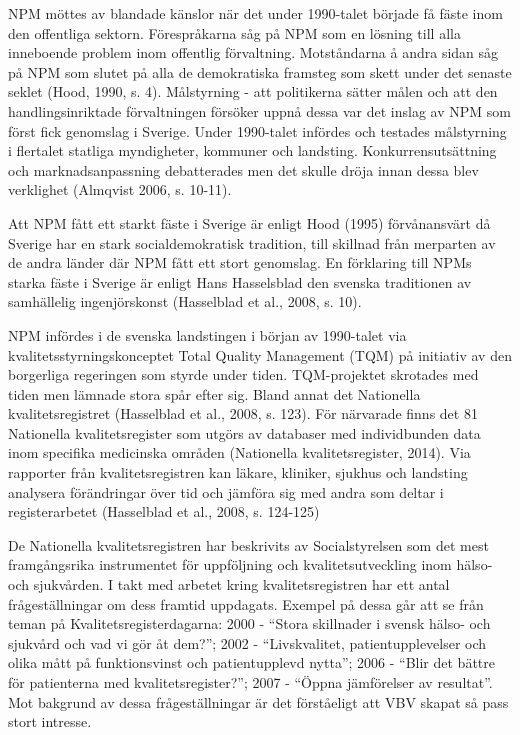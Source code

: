 NPM möttes av blandade känslor när det under 1990-talet började få fäste inom den offentliga sektorn. Förespråkarna såg på NPM som en lösning till alla inneboende problem inom offentlig förvaltning. Motståndarna å andra sidan såg på NPM som slutet på alla de demokratiska framsteg som skett under det senaste seklet (Hood, 1990, s. 4). Målstyrning - att politikerna sätter målen och att den handlingsinriktade förvaltningen försöker uppnå dessa var det inslag av NPM som först fick genomslag i Sverige. Under 1990-talet infördes och testades målstyrning i flertalet statliga myndigheter, kommuner och landsting. Konkurrensutsättning och marknadsanpassning debatterades men det skulle dröja innan dessa blev verklighet (Almqvist 2006, s. 10-11).
 
Att NPM fått ett starkt fäste i Sverige är enligt Hood (1995) förvånansvärt då Sverige har en stark socialdemokratisk tradition, till skillnad från merparten av de andra länder där NPM fått ett stort genomslag. En förklaring till NPMs starka fäste i Sverige är enligt Hans Hasselsblad den svenska traditionen av samhällelig ingenjörskonst (Hasselblad et al., 2008, s. 10).
 
NPM infördes i de svenska landstingen i början av 1990-talet via kvalitetsstyrningskonceptet Total Quality Management (TQM) på initiativ av den borgerliga regeringen som styrde under tiden. TQM-projektet skrotades med tiden men lämnade stora spår efter sig. Bland annat det Nationella kvalitetsregistret (Hasselblad et al., 2008, s. 123). För närvarade finns det 81 Nationella kvalitetsregister som utgörs av databaser med individbunden data inom specifika medicinska områden (Nationella kvalitetsregister, 2014). Via rapporter från kvalitetsregistren kan läkare, kliniker, sjukhus och landsting analysera förändringar över tid och jämföra sig med andra som deltar i registerarbetet (Hasselblad et al., 2008, s. 124-125)

De Nationella kvalitetsregistren har beskrivits av Socialstyrelsen som det mest framgångsrika instrumentet för uppföljning och kvalitetsutveckling inom hälso- och sjukvården. I takt med arbetet kring kvalitetsregistren har ett antal frågeställningar om dess framtid uppdagats. Exempel på dessa går att se från teman på Kvalitetsregisterdagarna: 2000 - “Stora skillnader i svensk hälso- och sjukvård och vad vi gör åt dem?”; 2002 - “Livskvalitet, patientupplevelser och olika mått på funktionsvinst och patientupplevd nytta”; 2006 - “Blir det bättre för patienterna med kvalitetsregister?”; 2007 - “Öppna jämförelser av resultat”. Mot bakgrund av dessa frågeställningar är det förståeligt att VBV skapat så pass stort intresse. 

